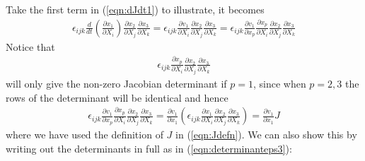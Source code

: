 Take the first term in (\ref{eqn:dJdt1}) to illustrate, it becomes
\begin{align}
\epsilon_{ijk} \frac{d}{dt}(\frac{\partial x_1}{\partial X_i})\frac{\partial x_2}{\partial X_j}\frac{\partial x_3}{\partial X_k} = \epsilon_{ijk} \frac{\partial v_1}{\partial X_i}\frac{\partial x_2}{\partial X_j}\frac{\partial x_3}{\partial X_k} = \epsilon_{ijk} \frac{\partial v_1}{\partial x_p}\frac{\partial x_p}{\partial X_i}\frac{\partial x_2}{\partial X_j}\frac{\partial x_3}{\partial X_k} 
\end{align}
Notice that
\begin{align*}
\epsilon_{ijk} \frac{\partial x_p}{\partial X_i}\frac{\partial x_2}{\partial X_j}\frac{\partial x_3}{\partial X_k}
\end{align*}
will only give the non-zero Jacobian determinant if $p=1$, since when $p=2,3$ the rows of the determinant will be identical and hence
\begin{align}
\epsilon_{ijk} \frac{\partial v_1}{\partial x_p}\frac{\partial x_p}{\partial X_i}\frac{\partial x_2}{\partial X_j}\frac{\partial x_3}{\partial X_k} =  \frac{\partial v_1}{\partial x_1}(\epsilon_{ijk}\frac{\partial x_1}{\partial X_i}\frac{\partial x_2}{\partial X_j}\frac{\partial x_3}{\partial X_k}) = \frac{\partial v_1}{\partial x_1}J
\end{align}
where we have used the definition of $J$ in (\ref{eqn:Jdefn}). We can also show this by writing out the determinants in full as in (\ref{eqn:determinanteps3}):
